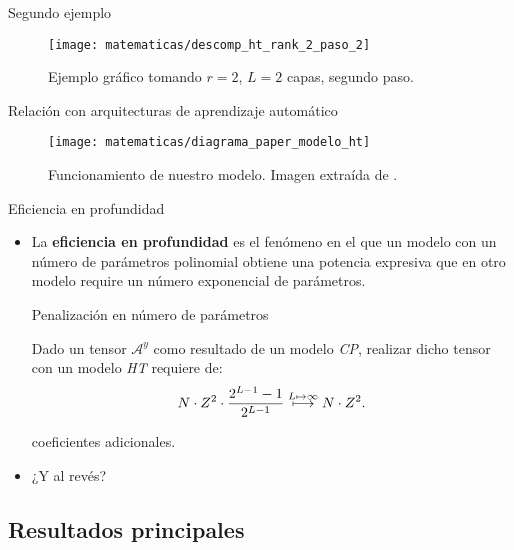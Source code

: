 \begin{frame}{Segundo ejemplo}

	\begin{figure}
		\texttt{[image: matematicas/descomp\_ht\_rank\_2\_paso\_2]}
		\caption{Ejemplo gráfico tomando $r = 2$, $L = 2$ capas, segundo paso.}
	\end{figure}

\end{frame}

\begin{frame}{Relación con arquitecturas de aprendizaje automático}

	\begin{figure}
		\centering
		\texttt{[image: matematicas/diagrama\_paper\_modelo\_ht]}
		\caption{Funcionamiento de nuestro modelo. Imagen extraída de .}
	\end{figure}


\end{frame}

\begin{frame}{Eficiencia en profundidad}
	\begin{itemize}
		\item La \textbf{eficiencia en profundidad} es el fenómeno en el que un modelo con un número de parámetros polinomial obtiene una potencia expresiva que en otro modelo require un número exponencial de parámetros.
		      \begin{block}{Penalización en número de parámetros}

			      Dado un tensor $\mathcal{A}^y$ como resultado de un modelo \textit{CP}, realizar dicho tensor con un modelo \textit{HT} requiere de:
			      \begin{equation}
				      N \cdot Z^2 \cdot \frac{2^{L-1} - 1}{2^{L-1}} \stackrel{L \mapsto \infty}{\longmapsto} N \cdot Z^2.
			      \end{equation}

			      coeficientes adicionales.
		      \end{block}

		\item ¿Y al revés?
	\end{itemize}
\end{frame}

\subsection{Resultados principales}


